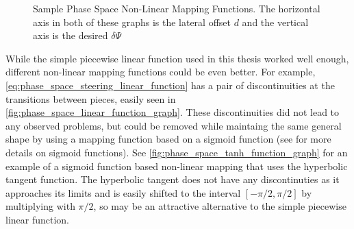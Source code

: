 \begin{figure}
\centering
{}
\hfill
{}
\caption[Sample Phase Space Non-Linear Mapping Functions]{Sample Phase Space Non-Linear Mapping Functions. The horizontal axis in both of these graphs is the lateral offset $d$ and the vertical axis is the desired $\delta\Psi$}
\label{fig:phase_space_sample_function_graphs}
\end{figure}

While the simple piecewise linear function used in this thesis worked well enough, different non-linear mapping functions could be even better. For example, \eqref{eq:phase_space_steering_linear_function} has a pair of discontinuities at the transitions between pieces, easily seen in \autoref{fig:phase_space_linear_function_graph}. These discontinuities did not lead to any observed problems, but could be removed while maintaing the same general shape by using a mapping function based on a sigmoid function (see \autocite{SigmoidFunctionWiki} for more details on sigmoid functions). See \autoref{fig:phase_space_tanh_function_graph} for an example of a sigmoid function based non-linear mapping that uses the hyperbolic tangent function. The hyperbolic tangent does not have any discontinuties as it approaches its limits and is easily shifted to the interval $\left[-\pi/2,\pi/2\right]$ by multiplying with $\pi/2$, so may be an attractive alternative to the simple piecewise linear function.

